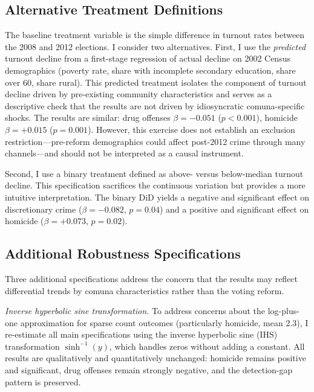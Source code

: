 \documentclass[12pt]{article}
\begin{document}
\subsection{Alternative Treatment Definitions}

The baseline treatment variable is the simple difference in turnout rates between the 2008 and 2012 elections. I consider two alternatives. First, I use the \textit{predicted} turnout decline from a first-stage regression of actual decline on 2002 Census demographics (poverty rate, share with incomplete secondary education, share over 60, share rural). This predicted treatment isolates the component of turnout decline driven by pre-existing community characteristics and serves as a descriptive check that the results are not driven by idiosyncratic comuna-specific shocks. The results are similar: drug offenses $\beta = -0.051$ ($p < 0.001$), homicide $\beta = +0.015$ ($p = 0.001$). However, this exercise does not establish an exclusion restriction---pre-reform demographics could affect post-2012 crime through many channels---and should not be interpreted as a causal instrument.

Second, I use a binary treatment defined as above- versus below-median turnout decline. This specification sacrifices the continuous variation but provides a more intuitive interpretation. The binary DiD yields a negative and significant effect on discretionary crime ($\beta = -0.082$, $p = 0.04$) and a positive and significant effect on homicide ($\beta = +0.073$, $p = 0.02$).

\subsection{Additional Robustness Specifications}

Three additional specifications address the concern that the results may reflect differential trends by comuna characteristics rather than the voting reform.

\textit{Inverse hyperbolic sine transformation.} To address concerns about the log-plus-one approximation for sparse count outcomes (particularly homicide, mean 2.3), I re-estimate all main specifications using the inverse hyperbolic sine (IHS) transformation $\sinh^{-1}(y)$, which handles zeros without adding a constant. All results are qualitatively and quantitatively unchanged: homicide remains positive and significant, drug offenses remain strongly negative, and the detection-gap pattern is preserved.
\end{document}
